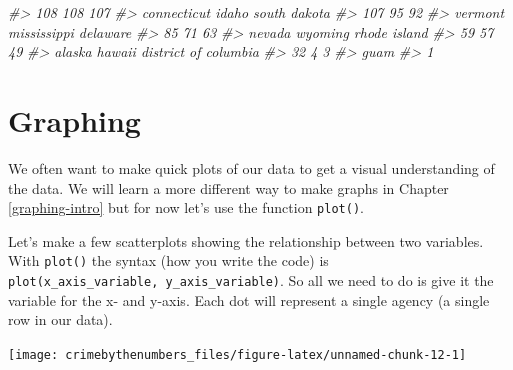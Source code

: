 \documentclass[
  12pt,
]{book}
\newenvironment{Shaded}{\begin{snugshade}}{\end{snugshade}}
\newcommand{\CommentTok}[1]{\textcolor[rgb]{0.37,0.37,0.37}{\textit{#1}}}
\newcommand{\FunctionTok}[1]{\textcolor[rgb]{0,0,0}{#1}}
\newcommand{\NormalTok}[1]{#1}
\newcommand{\SpecialCharTok}[1]{\textcolor[rgb]{0,0,0}{#1}}
\begin{document}
\begin{Shaded}
\begin{Highlighting}[]
\CommentTok{\#\textgreater{}                  108                  108                  107 }
\CommentTok{\#\textgreater{}          connecticut                idaho         south dakota }
\CommentTok{\#\textgreater{}                  107                   95                   92 }
\CommentTok{\#\textgreater{}              vermont          mississippi             delaware }
\CommentTok{\#\textgreater{}                   85                   71                   63 }
\CommentTok{\#\textgreater{}               nevada              wyoming         rhode island }
\CommentTok{\#\textgreater{}                   59                   57                   49 }
\CommentTok{\#\textgreater{}               alaska               hawaii district of columbia }
\CommentTok{\#\textgreater{}                   32                    4                    3 }
\CommentTok{\#\textgreater{}                 guam }
\CommentTok{\#\textgreater{}                    1}
\end{Highlighting}
\end{Shaded}

\hypertarget{graphing}{%
\section{Graphing}\label{graphing}}

We often want to make quick plots of our data to get a visual understanding of the data. We will learn a more different way to make graphs in Chapter \ref{graphing-intro} but for now let's use the function \texttt{plot()}.

Let's make a few scatterplots showing the relationship between two variables. With \texttt{plot()} the syntax (how you write the code) is \texttt{plot(x\_axis\_variable,\ y\_axis\_variable)}. So all we need to do is give it the variable for the x- and y-axis. Each dot will represent a single agency (a single row in our data).

\begin{Shaded}
\end{Shaded}

\begin{center}\texttt{[image: crimebythenumbers\_files/figure-latex/unnamed-chunk-12-1]} \end{center}
\end{document}
